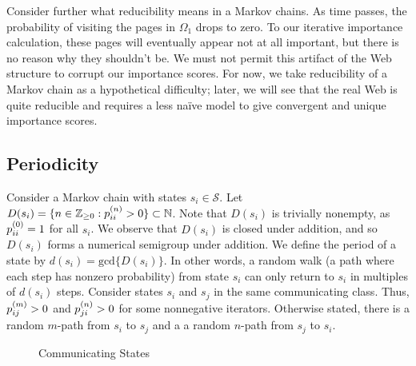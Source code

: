 \documentclass[../exploring-pagerank.tex]{subfiles}
\begin{document}
	Consider further what reducibility means in a Markov chains. As time passes, the probability of visiting the pages in $\Omega_1$ drops to zero. To our iterative importance calculation, these pages will eventually appear not at all important, but there is no reason why they shouldn't be. We must not permit this artifact of the Web structure to corrupt our importance scores. For now, we take reducibility of a Markov chain as a hypothetical difficulty; later, we will see that the real Web is quite reducible and requires a less naïve model to give convergent and unique importance scores.

	\subsection{Periodicity}
	Consider a Markov chain with states $s_i \in \mathcal{S}$. Let $D(s_i) = \{n\in \mathbb{Z}_{\geq 0} : p^{(n)}_{ii} > 0 \} \subset \mathbb{N}$. Note that $D(s_i)$ is trivially nonempty, as $p^{(0)}_{ii} = 1$ for all $s_i$. We observe that $D(s_i)$ is closed under addition, and so $D(s_i)$ forms a numerical semigroup under addition. We define the period of a state by $d(s_i)=\text{gcd}\{D(s_i)\}$. In other words, a random walk (a path where each step has nonzero probability) from state $s_i$ can only return to $s_i$ in multiples of $d(s_i)$ steps. Consider states $s_i$ and $s_j$ in the same communicating class. 
	Thus, $p^{(m)}_{ij} > 0$ and $p^{(n)}_{ji} > 0$ for some nonnegative iterators. Otherwise stated, there is a random $m$-path from $s_i$ to $s_j$ and a a random $n$-path from $s_j$ to $s_i$.
		\begin{figure}[h]
		\centering {}
		\caption{Communicating States}
		\label{fig:markov}
	\end{figure}
	
\end{document}
